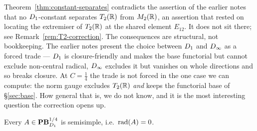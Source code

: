 \begin{remark}\label{rem:separation-correction}
Theorem~\ref{thm:constant-separates} contradicts the assertion of the earlier
notes that no $D_1$-constant separates $T_2(\mathbb{R})$ from $M_2(\mathbb{R})$, an
assertion that rested on locating the extremiser of $T_2(\mathbb{R})$ at the shared
element $E_{12}$.  It does not sit there; see
Remark~\ref{rem:T2-correction}.  The consequences are structural, not
bookkeeping.  The earlier notes present the choice between $D_1$ and
$D_\infty$ as a forced trade --- $D_1$ is closure-friendly and makes
the base functorial but cannot exclude non-central radical, $D_\infty$
excludes it but vanishes on whole directions and so breaks closure.  At
$C=\tfrac14$ the trade is not forced in the one case we can compute: the norm
gauge excludes $T_2(\mathbb{R})$ \emph{and} keeps the functorial base of
\S\ref{sec:base}.  How general that is, we do not know, and it is the most
interesting question the correction opens up.
\end{remark}

\begin{conjecture}
\label{conj:semisimple}
Every $A\in\mathbf{PB}^{1/4}_{D_1}$ is semisimple, i.e.\ $\operatorname{rad}(A)=0$.
\end{conjecture}

